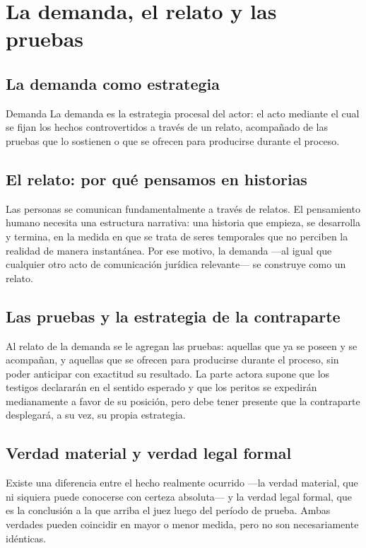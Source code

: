 \documentclass[12pt,oneside]{book}
\begin{document}
\section{La demanda, el relato y las pruebas}

\subsection{La demanda como estrategia}

\begin{definition}{Demanda}
La demanda es la estrategia procesal del actor: el acto mediante el cual se fijan los hechos controvertidos a través de un relato, acompañado de las pruebas que lo sostienen o que se ofrecen para producirse durante el proceso.
\end{definition}

\subsection{El relato: por qué pensamos en historias}

Las personas se comunican fundamentalmente a través de relatos. El pensamiento humano necesita una estructura narrativa: una historia que empieza, se desarrolla y termina, en la medida en que se trata de seres temporales que no perciben la realidad de manera instantánea. Por ese motivo, la demanda —al igual que cualquier otro acto de comunicación jurídica relevante— se construye como un relato.

\subsection{Las pruebas y la estrategia de la contraparte}

Al relato de la demanda se le agregan las pruebas: aquellas que ya se poseen y se acompañan, y aquellas que se ofrecen para producirse durante el proceso, sin poder anticipar con exactitud su resultado. La parte actora supone que los testigos declararán en el sentido esperado y que los peritos se expedirán medianamente a favor de su posición, pero debe tener presente que la contraparte desplegará, a su vez, su propia estrategia.

\subsection{Verdad material y verdad legal formal}

Existe una diferencia entre el hecho realmente ocurrido —la verdad material, que ni siquiera puede conocerse con certeza absoluta— y la verdad legal formal, que es la conclusión a la que arriba el juez luego del período de prueba. Ambas verdades pueden coincidir en mayor o menor medida, pero no son necesariamente idénticas.
\end{document}
